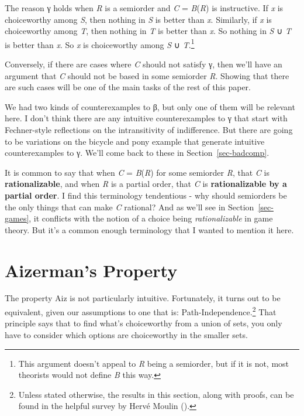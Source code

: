 \documentclass[
  11pt,
  letterpaper,
  DIV=11,
  numbers=noendperiod,
  twoside]{scrartcl}
\begin{document}
The reason γ holds when \emph{R} is a semiorder and \emph{C} =
\emph{B}(\emph{R}) is instructive. If \emph{x} is choiceworthy among
\emph{S}, then nothing in \emph{S} is better than \emph{x}. Similarly,
if \emph{x} is choiceworthy among \emph{T}, then nothing in \emph{T} is
better than \emph{x}. So nothing in \emph{S} ∪ \emph{T} is better than
\emph{x}. So \emph{x} is choiceworthy among \emph{S} ∪
\emph{T}.\footnote{This argument doesn't appeal to \emph{R} being a
  semiorder, but if it is not, most theorists would not define \emph{B}
  this way.}

Conversely, if there are cases where \emph{C} should not satisfy γ, then
we'll have an argument that \emph{C} should not be based in some
semiorder \emph{R}. Showing that there are such cases will be one of the
main tasks of the rest of this paper.

We had two kinds of counterexamples to β, but only one of them will be
relevant here. I don't think there are any intuitive counterexamples to
γ that start with Fechner-style reflections on the intransitivity of
indifference. But there are going to be variations on the bicycle and
pony example that generate intuitive counterexamples to γ. We'll come
back to these in Section~\ref{sec-badcomp}.

It is common to say that when \emph{C} = \emph{B}(\emph{R}) for some
semiorder \emph{R}, that \emph{C} is \textbf{rationalizable}, and when
\emph{R} is a partial order, that \emph{C} is \textbf{rationalizable by
a partial order}. I find this terminology tendentious - why should
semiorders be the only things that can make \emph{C} rational? And as
we'll see in Section~\ref{sec-games}, it conflicts with the notion of a
choice being \emph{rationalizable} in game theory. But it's a common
enough terminology that I wanted to mention it here.

\section{Aizerman's Property}\label{sec-aiz}

The property Aiz is not particularly intuitive. Fortunately, it turns
out to be equivalent, given our assumptions to one that is:
Path-Independence.\footnote{Unless stated otherwise, the results in this
  section, along with proofs, can be found in the helpful survey by
  Hervé Moulin ().} That principle says
that to find what's choiceworthy from a union of sets, you only have to
consider which options are choiceworthy in the smaller sets.
\end{document}
